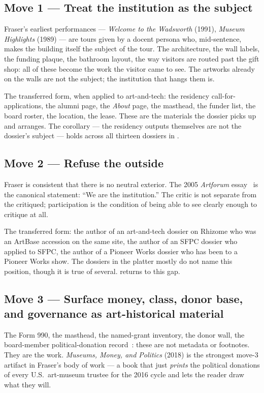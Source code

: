 \documentclass[10pt,letterpaper,twocolumn]{article}
\begin{document}
\subsection{Move 1 --- Treat the institution as the subject}

Fraser's earliest performances --- \emph{Welcome to the Wadsworth} (1991), \emph{Museum Highlights} (1989) --- are tours given by a docent persona who, mid-sentence, makes the building itself the subject of the tour. The architecture, the wall labels, the funding plaque, the bathroom layout, the way visitors are routed past the gift shop: all of these become the work the visitor came to see. The artworks already on the walls are not the subject; the institution that hangs them is.

The transferred form, when applied to art-and-tech: the residency call-for-applications, the alumni page, the \emph{About} page, the masthead, the funder list, the board roster, the location, the lease. These are the materials the dossier picks up and arranges. The corollary --- the residency outputs themselves are not the dossier's subject --- holds across all thirteen dossiers in .

\subsection{Move 2 --- Refuse the outside}

Fraser is consistent that there is no neutral exterior. The 2005 \emph{Artforum} essay~\citep{fraser2005critique} is the canonical statement: ``We are the institution.'' The critic is not separate from the critiqued; participation is the condition of being able to see clearly enough to critique at all.

The transferred form: the author of an art-and-tech dossier on Rhizome who was an ArtBase accession on the same site, the author of an SFPC dossier who applied to SFPC, the author of a Pioneer Works dossier who has been to a Pioneer Works show. The dossiers in the platter mostly do not name this position, though it is true of several.  returns to this gap.

\subsection{Move 3 --- Surface money, class, donor base, and governance as art-historical material}

The Form 990, the masthead, the named-grant inventory, the donor wall, the board-member political-donation record~\citep{fraser2018museums}: these are not metadata or footnotes. They are the work. \emph{Museums, Money, and Politics} (2018) is the strongest move-3 artifact in Fraser's body of work --- a book that just \emph{prints} the political donations of every U.S.\ art-museum trustee for the 2016 cycle and lets the reader draw what they will.
\end{document}
